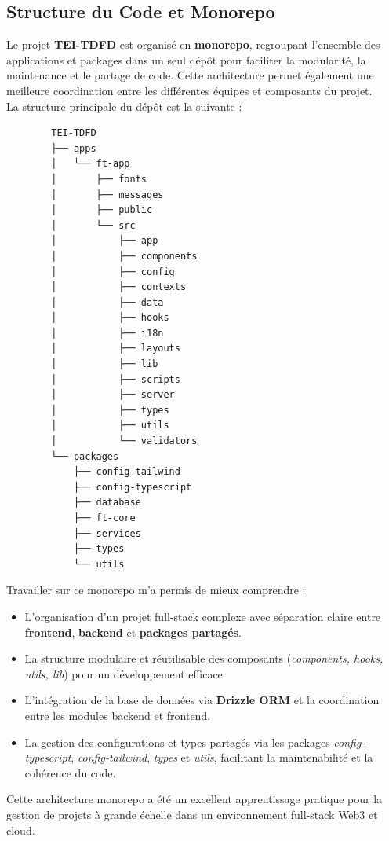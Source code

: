 \subsection{Structure du Code et Monorepo}
Le projet \textbf{TEI-TDFD} est organisé en \textbf{monorepo}, regroupant l'ensemble des applications et packages dans un seul dépôt pour faciliter la modularité, la maintenance et le partage de code. Cette architecture permet également une meilleure coordination entre les différentes équipes et composants du projet. \\[1mm]
La structure principale du dépôt est la suivante :
\vskip5cm
        \begin{verbatim}
        TEI-TDFD
        ├── apps
        │   └── ft-app
        │       ├── fonts
        │       ├── messages
        │       ├── public
        │       └── src
        │           ├── app
        │           ├── components
        │           ├── config
        │           ├── contexts
        │           ├── data
        │           ├── hooks
        │           ├── i18n
        │           ├── layouts
        │           ├── lib
        │           ├── scripts
        │           ├── server
        │           ├── types
        │           ├── utils
        │           └── validators
        └── packages
            ├── config-tailwind
            ├── config-typescript
            ├── database
            ├── ft-core
            ├── services
            ├── types
            └── utils
        \end{verbatim}
Travailler sur ce monorepo m'a permis de mieux comprendre :
\begin{itemize}
    \item L'organisation d'un projet full-stack complexe avec séparation claire entre \textbf{frontend}, \textbf{backend} et \textbf{packages partagés}.
    \item La structure modulaire et réutilisable des composants (\textit{components, hooks, utils, lib}) pour un développement efficace.
    \item L'intégration de la base de données via \textbf{Drizzle ORM} et la coordination entre les modules backend et frontend.
    \item La gestion des configurations et types partagés via les packages \textit{config-typescript}, \textit{config-tailwind}, \textit{types} et \textit{utils}, facilitant la maintenabilité et la cohérence du code.
\end{itemize}
Cette architecture monorepo a été un excellent apprentissage pratique pour la gestion de projets à grande échelle dans un environnement full-stack Web3 et cloud.


